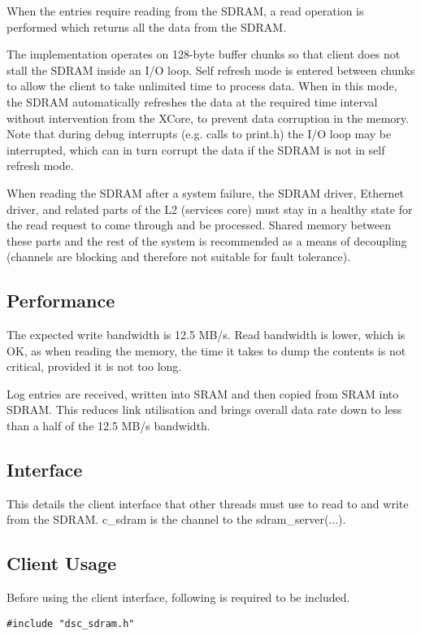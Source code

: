 When the entries require reading from the SDRAM, a read operation is performed which returns all the data from the SDRAM.

The implementation operates on 128-byte buffer chunks so that client does not stall the SDRAM inside an I/O loop.
Self refresh mode is entered between chunks to allow the client to take unlimited time to process data.
When in this mode, the SDRAM automatically refreshes the data at the required time interval without intervention from the XCore, to prevent data corruption in the memory.
Note that during debug interrupts (e.g. calls to print.h) the I/O loop may be interrupted, which can in turn corrupt the data if the SDRAM is not in self refresh mode.

When reading the SDRAM after a system failure, the SDRAM driver, Ethernet driver, and related parts of the L2 (services core) must stay in a healthy state for the read request to come through and be processed.
Shared memory between these parts and the rest of the system is recommended as a means of decoupling (channels are blocking and therefore not suitable for fault tolerance).


\subsection{Performance}

The expected write bandwidth is 12.5 MB/s.
Read bandwidth is lower, which is OK, as when reading the memory, the time it takes to dump the contents is not critical, provided it is not too long.

Log entries are received, written into SRAM and then copied from SRAM into SDRAM.
This reduces link utilisation and brings overall data rate down to less than a half of the 12.5 MB/s bandwidth.


\subsection{Interface}

This details the client interface that other threads must use to read to and write from the SDRAM. c\_sdram is the channel to the sdram\_server(...).


\subsection{Client Usage}
Before using the client interface, following is required to be included.

\begin{lstlisting}
#include "dsc_sdram.h"
\end{lstlisting}


